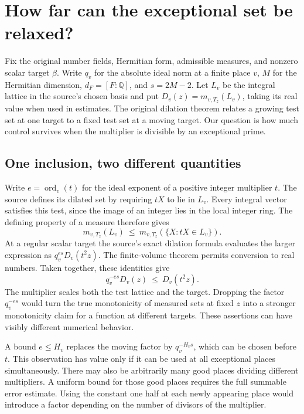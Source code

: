 \documentclass[12pt,letterpaper]{article}
\begin{document}
\section{How far can the exceptional set be relaxed?}

Fix the original number fields, Hermitian form, admissible measures, and nonzero scalar target $\beta$. Write $q_v$ for the absolute ideal norm at a finite place $v$, $M$ for the Hermitian dimension, $d_F=[F:\mathbb Q]$, and $s=2M-2$. Let $L_v$ be the integral lattice in the source's chosen basis and put $D_v(z)=m_{v,T_z}(L_v)$, taking its real value when used in estimates. The original dilation theorem relates a growing test set at one target to a fixed test set at a moving target. Our question is how much control survives when the multiplier is divisible by an exceptional prime.

\subsection{One inclusion, two different quantities}
Write $e=\operatorname{ord}_v(t)$ for the ideal exponent of a positive integer multiplier $t$. The source defines its dilated set by requiring $tX$ to lie in $L_v$. Every integral vector satisfies this test, since the image of an integer lies in the local integer ring. The defining property of a measure therefore gives
\[
    m_{v,T_z}(L_v)\ \leq\ m_{v,T_z}(\{X:tX\in L_v\}).
\]
At a regular scalar target the source's exact dilation formula evaluates the larger expression as $q_v^{es} D_v(t^2z)$. The finite-volume theorem permits conversion to real numbers. Taken together, these identities give
\[
       q_v^{-es}D_v(z)\ \leq\ D_v(t^2z).
\]
The multiplier scales both the test lattice and the target. Dropping the factor $q_v^{-es}$ would turn the true monotonicity of measured sets at fixed $z$ into a stronger monotonicity claim for a function at different targets. These assertions can have visibly different numerical behavior.

A bound $e\leq H_v$ replaces the moving factor by $q_v^{-H_v s}$, which can be chosen before $t$. This observation has value only if it can be used at all exceptional places simultaneously. There may also be arbitrarily many good places dividing different multipliers. A uniform bound for those good places requires the full summable error estimate. Using the constant one half at each newly appearing place would introduce a factor depending on the number of divisors of the multiplier.
\end{document}
